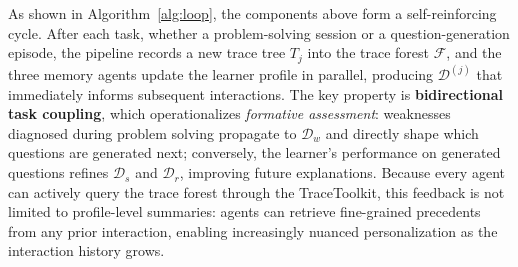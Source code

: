 As shown in Algorithm~\ref{alg:loop}, the components above form a self-reinforcing cycle.
After each task, whether a problem-solving session or a question-generation episode, the pipeline records a new trace tree $T_j$ into the trace forest $\mathcal{F}$, and the three memory agents update the learner profile in parallel, producing $\mathcal{D}^{(j)}$ that immediately informs subsequent interactions.
The key property is \textbf{bidirectional task coupling}, which operationalizes \textit{formative assessment}: weaknesses diagnosed during problem solving propagate to $\mathcal{D}_w$ and directly shape which questions are generated next; conversely, the learner's performance on generated questions refines $\mathcal{D}_s$ and $\mathcal{D}_r$, improving future explanations.
Because every agent can actively query the trace forest through the TraceToolkit, this feedback is not limited to profile-level summaries: agents can retrieve fine-grained precedents from any prior interaction, enabling increasingly nuanced personalization as the interaction history grows.
